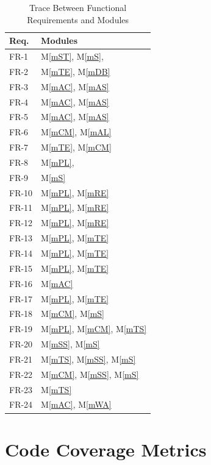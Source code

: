 \documentclass[12pt, titlepage]{article}
\newcommand{\mref}[1]{M\ref{#1}}
\begin{document}
\begin{table}
\centering
\begin{tabular}{p{} p{}}
\toprule
\textbf{Req.} & \textbf{Modules}\\
\midrule
FR-1 & \mref{mST}, \mref{mS},\\
FR-2 & \mref{mTE}, \mref{mDB}\\
FR-3 & \mref{mAC}, \mref{mAS}\\
FR-4 & \mref{mAC}, \mref{mAS}\\
FR-5 & \mref{mAC}, \mref{mAS}\\
FR-6 & \mref{mCM}, \mref{mAL}\\
FR-7 & \mref{mTE}, \mref{mCM}\\
FR-8 & \mref{mPL},\\
FR-9 & \mref{mS}\\
FR-10 & \mref{mPL}, \mref{mRE}\\
FR-11 & \mref{mPL}, \mref{mRE}\\
FR-12 & \mref{mPL}, \mref{mRE}\\
FR-13 & \mref{mPL}, \mref{mTE}\\
FR-14 & \mref{mPL}, \mref{mTE}\\
FR-15 & \mref{mPL}, \mref{mTE}\\
FR-16 & \mref{mAC}\\
FR-17 & \mref{mPL}, \mref{mTE}\\
FR-18 & \mref{mCM}, \mref{mS}\\
FR-19 & \mref{mPL}, \mref{mCM}, \mref{mTS}\\
FR-20 & \mref{mSS}, \mref{mS}\\
FR-21 & \mref{mTS}, \mref{mSS}, \mref{mS}\\
FR-22 & \mref{mCM}, \mref{mSS}, \mref{mS}\\
FR-23 & \mref{mTS}\\
FR-24 & \mref{mAC}, \mref{mWA}\\
\bottomrule
\end{tabular}
\caption{Trace Between Functional Requirements and Modules}
\label{TblRT}
\end{table}

\section{Code Coverage Metrics}



\end{document}
